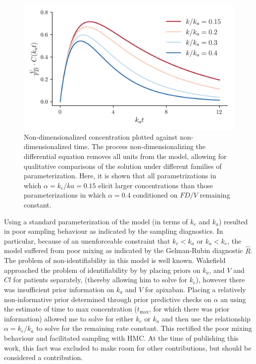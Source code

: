 \begin{figure}[h!]
	\centering
	\includegraphics{figures/pkcurves.png}
	\caption[Non-dimensionalized solutions to pharmacokinetic differential equation] {Non-dimensionalized concentration plotted against non-dimensionalized time.  The process non-dimensionalizing the differential equation removes all units from the model, allowing for qualitative comparisons of the solution under different families of parameterization.  Here, it is shown that all parametrizations in which $\alpha = k_e/ka = 0.15$ elicit larger concentrations than those parameterizations in which $\alpha=0.4$ conditioned on $FD/V$ remaining constant.}
	\label{fig:pkcureves}
\end{figure}

Using a standard parameterization of the model (in terms of $k_e$ and $k_a$) resulted in poor sampling behaviour as indicated by the sampling diagnostics.  In particular, because of an unenforceable constraint that $k_e < k_a$ or $k_a < k_e$, the model suffered from poor mixing as indicated by the Gelman-Rubin diagnostic $\hat{R}$.  The problem of non-identifiability in this model is well known.  Wakefield approached the problem of identifiability by \cite{wakefield1992bayesian} by placing priors on $k_a$, and $V$ and $Cl$ for patients separately, (thereby allowing him to solve for $k_e$), however there was insufficient prior information on $k_a$ and $V$ for apixaban.
Placing a relatively non-informative prior determined through prior predictive checks on $\alpha$ an using the estimate of time to max concentration ($t_{\max}$, for which there was prior information) allowed me to solve for either $k_e$ or $k_a$ and then use the relationship $\alpha = k_e / k_a$ to solve for the remaining rate constant.  This rectified the poor mixing behaviour and facilitated sampling with HMC.  At the time of publishing this work, this fact was excluded to make room for other contributions, but should be considered a contribution.

